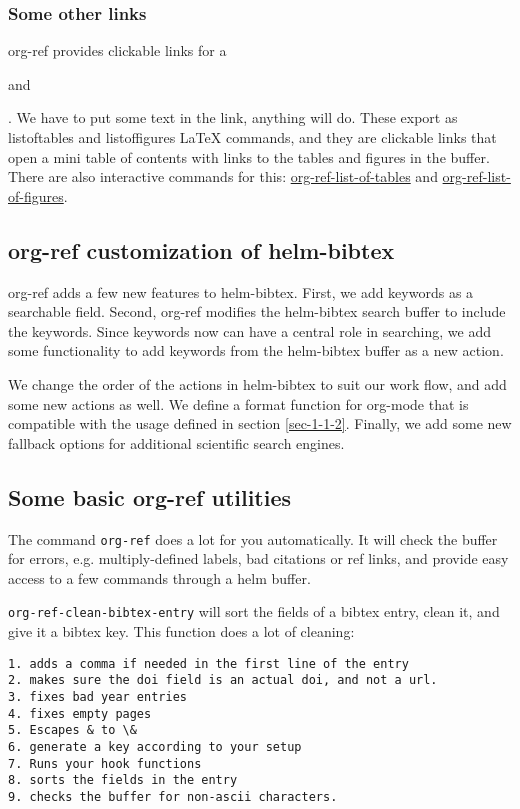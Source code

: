 \documentclass[11pt]{article}
\begin{document}
\subsubsection{Some other links}
\label{sec-1-1-5}
 

org-ref provides clickable links for a \listoftables and \listoffigures. We have to put some text in the link, anything will do. These export as listoftables and listoffigures \LaTeX{} commands, and they are clickable links that open a mini table of contents with links to the tables and figures in the buffer. There are also interactive commands for this: \url{org-ref-list-of-tables} and \url{org-ref-list-of-figures}.

\subsection{org-ref customization of helm-bibtex}
\label{sec-1-2}

org-ref adds a few new features to helm-bibtex. First, we add keywords as a searchable field. Second, org-ref modifies the helm-bibtex search buffer to include the keywords. Since keywords now can have a central role in searching, we add some functionality to add keywords from the helm-bibtex buffer as a new action.

We change the order of the actions in helm-bibtex to suit our work flow, and add some new actions as well. We define a format function for org-mode that is compatible with the usage defined in section \ref{sec-1-1-2}. Finally, we add some new fallback options for additional scientific search engines.

\subsection{Some basic org-ref utilities}
\label{sec-1-3}

The command \verb~org-ref~ does a lot for you automatically. It will check the buffer for errors, e.g. multiply-defined labels, bad citations or ref links, and provide easy access to a few commands through a helm buffer.

\verb~org-ref-clean-bibtex-entry~ will sort the fields of a bibtex entry, clean it, and give it a bibtex key. This function does a lot of cleaning:

\begin{verbatim}
1. adds a comma if needed in the first line of the entry
2. makes sure the doi field is an actual doi, and not a url.
3. fixes bad year entries
4. fixes empty pages
5. Escapes & to \&
6. generate a key according to your setup
7. Runs your hook functions
8. sorts the fields in the entry
9. checks the buffer for non-ascii characters.
\end{verbatim}
\end{document}
